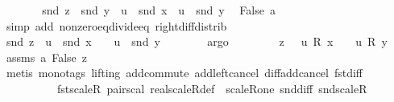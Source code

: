 \begin{isabellebody}
\ \ \ \ \isamarkupfalse%
\ \isamarkupfalse%
\ {\isachardoublequoteopen}snd\ z\ {\isacharequal}{\kern0pt}\ snd\ y\ {\isacharminus}{\kern0pt}\ u\ {\isacharasterisk}{\kern0pt}\ snd\ x\ {\isacharplus}{\kern0pt}\ u\ {\isacharasterisk}{\kern0pt}\ snd\ y{\isachardoublequoteclose}\ \isamarkupfalse%
\ {\isachardoublequoteopen}False{\isachardoublequoteclose}\ a{}\isanewline
\ \ \ \ \ \ \isamarkupfalse%
\ {\isacharparenleft}{\kern0pt}simp\ add{\isacharcolon}{\kern0pt}\ nonzero{\isacharunderscore}{\kern0pt}eq{\isacharunderscore}{\kern0pt}divide{\isacharunderscore}{\kern0pt}eq\ right{\isacharunderscore}{\kern0pt}diff{\isacharunderscore}{\kern0pt}distrib{\isacharparenright}{\kern0pt}\isanewline
\ \ \ \ \isamarkupfalse%
\ \isamarkupfalse%
\ {\isachardoublequoteopen}snd\ z\ {\isacharequal}{\kern0pt}\ {\isacharparenleft}{\kern0pt}{\isacharminus}{\kern0pt}u{\isacharparenright}{\kern0pt}\ {\isacharasterisk}{\kern0pt}\ snd\ x\ {\isacharplus}{\kern0pt}\ {\isacharparenleft}{\kern0pt}{}\ {\isacharplus}{\kern0pt}\ u{\isacharparenright}{\kern0pt}\ {\isacharasterisk}{\kern0pt}\ snd\ y{\isachardoublequoteclose}\isanewline
\ \ \ \ \ \ \isamarkupfalse%
\ argo\isanewline
\ \ \ \ \ \isamarkupfalse%
\ \isamarkupfalse%
\ {\isachardoublequoteopen}z\ {\isacharequal}{\kern0pt}\ {\isacharparenleft}{\kern0pt}{\isacharminus}{\kern0pt}\ u{\isacharparenright}{\kern0pt}\ {\isacharasterisk}{\kern0pt}\isactrlsub R\ x\ {\isacharplus}{\kern0pt}\ {\isacharparenleft}{\kern0pt}{}\ {\isacharplus}{\kern0pt}\ u{\isacharparenright}{\kern0pt}\ {\isacharasterisk}{\kern0pt}\isactrlsub R\ y{\isachardoublequoteclose}\ \isamarkupfalse%
\ assms\ a{}\ False\ z{}\isanewline
\ \ \ \ \ \ \isamarkupfalse%
\ {\isacharparenleft}{\kern0pt}metis\ {\isacharparenleft}{\kern0pt}mono{\isacharunderscore}{\kern0pt}tags{\isacharcomma}{\kern0pt}\ lifting{\isacharparenright}{\kern0pt}\ add{\isachardot}{\kern0pt}commute\ add{\isacharunderscore}{\kern0pt}left{\isacharunderscore}{\kern0pt}cancel\ diff{\isacharunderscore}{\kern0pt}add{\isacharunderscore}{\kern0pt}cancel\ fst{\isacharunderscore}{\kern0pt}diff\isanewline
\ \ \ \ \ \ \ \ \ \ fst{\isacharunderscore}{\kern0pt}scaleR\ pair{\isacharunderscore}{\kern0pt}scal\ real{\isacharunderscore}{\kern0pt}scaleR{\isacharunderscore}{\kern0pt}def\ \ scaleR{\isacharunderscore}{\kern0pt}one\ snd{\isacharunderscore}{\kern0pt}diff\ snd{\isacharunderscore}{\kern0pt}scaleR{\isacharparenright}{\kern0pt}\isanewline

\end{isabellebody}

